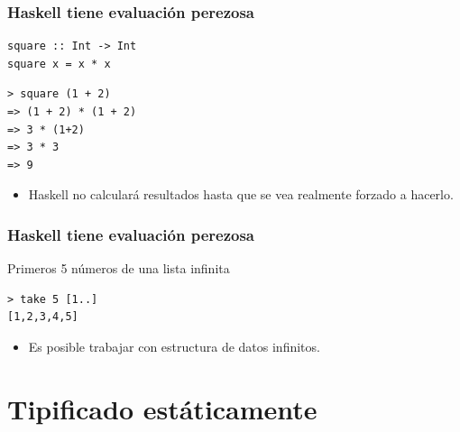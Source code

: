 \documentclass{beamer}
\begin{document}
\begin{frame}[fragile]
  \frametitle{Haskell tiene evaluación perezosa}

\begin{lstlisting}
square :: Int -> Int
square x = x * x
\end{lstlisting}

\begin{lstlisting}[numbers=none, backgroundcolor=\color{lightgray}, keywordstyle=\color{black}]
> square (1 + 2)
=> (1 + 2) * (1 + 2)
=> 3 * (1+2)
=> 3 * 3
=> 9
\end{lstlisting}

\vspace{0.3cm}

\begin{itemize}
\item Haskell no calculará resultados hasta que se vea realmente forzado a hacerlo. 
\end{itemize}

\end{frame}


\begin{frame}[fragile]
  \frametitle{Haskell tiene evaluación perezosa}

Primeros 5 números de una lista infinita

\begin{lstlisting}[numbers=none, backgroundcolor=\color{lightgray}, keywordstyle=\color{black}]
> take 5 [1..]
[1,2,3,4,5]
\end{lstlisting}

\vspace{0.3cm}

\begin{itemize}
\item Es posible trabajar con estructura de datos infinitos. 
\end{itemize}

\end{frame}


\section{Tipificado estáticamente}
\end{document}
